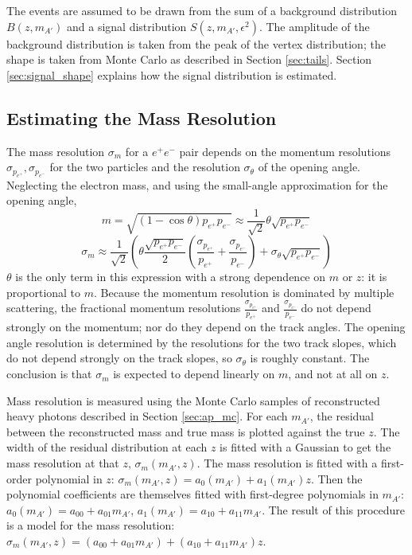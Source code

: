 The events are assumed to be drawn from the sum of a background distribution $B(z,m_{A'})$ and a signal distribution $S(z,m_{A'},\epsilon^2)$.
The amplitude of the background distribution is taken from the peak of the vertex distribution; the shape is taken from Monte Carlo as described in Section \ref{sec:tails}.
Section \ref{sec:signal_shape} explains how the signal distribution is estimated.

\subsection{Estimating the Mass Resolution}
\label{sec:mres}

The mass resolution $\sigma_m$ for a $e^+e^-$ pair depends on the momentum resolutions $\sigma_{p_{e^+}},\sigma_{p_{e^-}}$ for the two particles and the resolution $\sigma_\theta$ of the opening angle.
Neglecting the electron mass, and using the small-angle approximation for the opening angle,
\begin{equation}
m=\sqrt{(1-\cos\theta)p_{e^+}p_{e^-}} \approx \frac{1}{\sqrt{2}}\theta\sqrt{p_{e^+}p_{e^-}}
\end{equation}
\begin{equation}
\sigma_m\approx \frac{1}{\sqrt{2}}\left(\theta \frac{\sqrt{p_{e^+}p_{e^-}}}{2}\left(\frac{\sigma_{p_{e^+}}}{p_{e^+}}+\frac{\sigma_{p_{e^-}}}{p_{e^-}}\right)  + \sigma_\theta\sqrt{p_{e^+}p_{e^-}} \right)
\end{equation}
$\theta$ is the only term in this expression with a strong dependence on $m$ or $z$: it is proportional to $m$.
Because the momentum resolution is dominated by multiple scattering, the fractional momentum resolutions $\frac{\sigma_{p_{e^+}}}{p_{e^+}}$ and $\frac{\sigma_{p_{e^-}}}{p_{e^-}}$ do not depend strongly on the momentum; nor do they depend on the track angles.
The opening angle resolution is determined by the resolutions for the two track slopes, which do not depend strongly on the track slopes, so $\sigma_\theta$ is roughly constant.
The conclusion is that $\sigma_m$ is expected to depend linearly on $m$, and not at all on $z$.

Mass resolution is measured using the Monte Carlo samples of reconstructed heavy photons described in Section \ref{sec:ap_mc}.
For each $m_{A'}$, the residual between the reconstructed mass and true mass is plotted against the true $z$.
The width of the residual distribution at each $z$ is fitted with a Gaussian to get the mass resolution at that $z$, $\sigma_m(m_{A'},z)$.
The mass resolution is fitted with a first-order polynomial in $z$:
$\sigma_m(m_{A'},z) = a_0(m_{A'}) + a_1(m_{A'}) z$.
Then the polynomial coefficients are themselves fitted with first-degree polynomials in $m_{A'}$: $a_0(m_{A'}) = a_{00} + a_{01}m_{A'}$, $a_1(m_{A'}) = a_{10} + a_{11}m_{A'}$.
The result of this procedure is a model for the mass resolution: $\sigma_m(m_{A'},z) = (a_{00} + a_{01}m_{A'}) + (a_{10} + a_{11}m_{A'}) z$.

